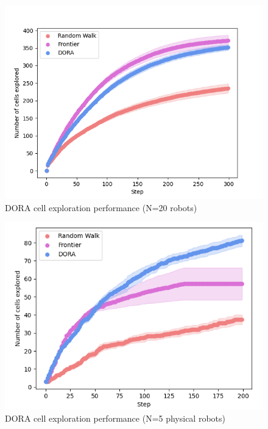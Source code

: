 \begin{figure}
    \includegraphics[width=16cm]{figures/dora_explorer/explored_20.png}
        \caption[DORA cell exploration performance (N=20 robots)]{DORA cell exploration performance (N=20 robots)}
        \label{results:explored20}
\end{figure}

\begin{figure}
    \includegraphics[width=16cm]{figures/dora_explorer/explored_real.png}
        \caption[DORA cell exploration performance (N=5 physical robots)]{DORA cell exploration performance (N=5 physical robots)}
        \label{results:cells_explored_physical}
\end{figure}


